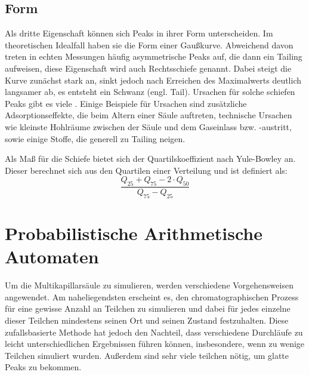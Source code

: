 \subsection{Form}
Als dritte Eigenschaft können sich Peaks in ihrer Form unterscheiden. Im theoretischen Idealfall haben sie die Form einer Gaußkurve. %
Abweichend davon treten in echten Messungen häufig asymmetrische Peaks auf, die dann ein Tailing aufweisen, diese Eigenschaft wird auch Rechtsschiefe genannt. Dabei steigt die Kurve zunächst stark an, sinkt jedoch nach Erreichen des Maximalwerts deutlich langsamer ab, es entsteht ein Schwanz (engl. Tail).
Ursachen für solche schiefen Peaks gibt es viele \cite{kolb2003, Moretti2004, Giddings1963}. Einige Beispiele für Ursachen sind zusätzliche Adsorptionseffekte, die beim Altern einer Säule auftreten, technische Ursachen wie kleinste Hohlräume zwischen der Säule und dem Gaseinlass bzw. -austritt, sowie einige Stoffe, die generell zu Tailing neigen. %

Als Maß für die Schiefe bietet sich der Quartilskoeffizient nach Yule-Bowley an. Dieser berechnet sich aus den Quartilen einer Verteilung und ist definiert als: 
\begin{equation*}
\frac{Q_{25} + Q_{75} -2\cdot Q_{50} }{ Q_{75} - Q_{25}}
\end{equation*}


\section{Probabilistische Arithmetische Automaten}
Um die Multikapillarsäule zu simulieren, werden verschiedene Vorgehensweisen angewendet. Am naheliegendsten erscheint es, den chromatographischen Prozess für eine gewisse Anzahl an Teilchen zu simulieren und dabei für jedes einzelne dieser Teilchen mindestens seinen Ort und seinen Zustand festzuhalten. Diese zufallsbasierte Methode hat jedoch den Nachteil, dass verschiedene Durchläufe zu leicht unterschiedlichen Ergebnissen führen können, insbesondere, wenn zu wenige Teilchen simuliert wurden.
Außerdem sind sehr viele teilchen nötig, um glatte Peaks zu bekommen.

